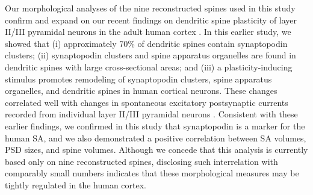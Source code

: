 \documentclass[12pt]{article}
\begin{document}
Our morphological analyses of the nine reconstructed spines used in this study confirm and expand on our recent findings on dendritic spine plasticity of layer II/III pyramidal neurons in the adult human cortex \cite{Lenz2021}. In this earlier study, we showed that (i) approximately 70\% of dendritic spines contain synaptopodin clusters; (ii) synaptopodin clusters and spine apparatus organelles are found in dendritic spines with large cross-sectional areas; and (iii) a plasticity-inducing stimulus promotes remodeling of synaptopodin clusters, spine apparatus organelles, and dendritic spines in human cortical neurons. These changes correlated well with changes in spontaneous excitatory postsynaptic currents recorded from individual layer II/III pyramidal neurons \cite{Lenz2021}. Consistent with these earlier findings, we confirmed in this study that synaptopodin is a marker for the human SA, and we also demonstrated a positive correlation between SA volumes, PSD sizes, and spine volumes. Although we concede that this analysis is currently based only on nine reconstructed spines, disclosing such interrelation with comparably small numbers indicates that these morphological measures may be tightly regulated in the human cortex. 
	
\end{document}

